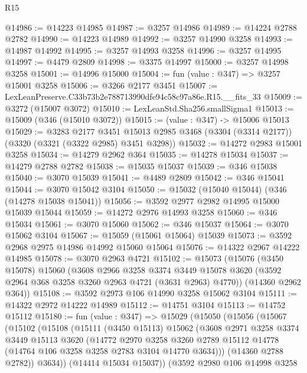 \begin{lexlean}{R15}
\begin{coremodule}
@14986 := @14223 @14985
@14987 := @3257 @14986
@14989 := @14224 @2788 @2782
@14990 := @14223 @14989
@14992 := @3257 @14990 @3258
@14993 := @14987 @14992
@14995 := @3257 @14993 @3258
@14996 := @3257 @14995
@14997 := @4479 @2809
@14998 := @3375 @14997
@15000 := @3257 @14998 @3258
@15001 := @14996 @15000
@15004 := fun (value : @347) => @3257 @15001 @3258
@15006 := @3266 @2177 @3451
@15007 := LexLeanPreserve.C33b73b2e788713990dfe94c58c97a86e.R15.__fits_33
@15009 := @3272 (@15007 @3072)
@15010 := LexLeanStd.Sha256.smallSigma1
@15013 := @15009 (@346 (@15010 @3072))
@15015 := (value : @347) -> @15006 @15013
@15029 := @3283
    @2177
    @3451
    @15013
    @2985
    @3468
    (@3304 (@3314 @2177))
    (@3320 (@3321 (@3322 @2985) @3451 @3298))
@15032 := @14272 @2983 @15001 @3258
@15034 := @14279 @2962 @364
@15035 := @14278 @15034
@15037 := @14279 @2788 @2782
@15038 := @15035 @15037
@15039 := @346 @15038
@15040 := @3070 @15039
@15041 := @4489 @2809
@15042 := @346 @15041
@15044 := @3070 @15042 @3104
@15050 := @15032 (@15040 @15044) (@346 (@14278 @15038 @15041))
@15056 := @3592 @2977 @2982 @14995 @15000 @15039 @15044
@15059 := @14272 @2976 @14993 @3258
@15060 := @346 @15034
@15061 := @3070 @15060
@15062 := @346 @15037
@15064 := @3070 @15062 @3104
@15067 := @15059 (@15061 @15064) @15039
@15073 := @3592 @2968 @2975 @14986 @14992 @15060 @15064
@15076 := @14322 @2967 @14222 @14985
@15078 := @3070 @2963 @4721
@15102 := @15073
    (@15076
      (@3450 @15078)
      @15060
      (@3608
        @2966
        @3258
        @3374
        @3449
        @15078
        @3620
        (@3592 @2964 @368 @3258 @3260 @2963 @4721 (@3631 @2963) @4770))
      (@14360 @2962 @364))
@15108 := @3592 @2973 @106 @14990 @3258 @15062 @3104
@15111 := @14322 @2972 @14222 @14989
@15112 := @14751 @3104
@15113 := @14752 @15112
@15180 := fun (value : @347) =>
  @15029
    (@15050
      (@15056
        (@15067
          (@15102
            (@15108
              (@15111
                (@3450 @15113)
                @15062
                (@3608
                  @2971
                  @3258
                  @3374
                  @3449
                  @15113
                  @3620
                  (@14772
                    @2970
                    @3258
                    @3260
                    @2789
                    @15112
                    @14778
                    (@14764 @106 @3258 @3258 @2783 @3104 @14770 @3634)))
                (@14360 @2788 @2782))
              @3634))
          (@14414 @15034 @15037))
        (@3592
          @2980
          @106
          @14998
          @3258

\end{coremodule}
\end{lexlean}
